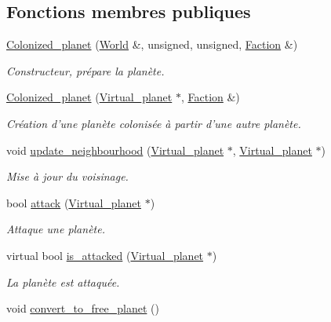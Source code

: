 \subsection*{Fonctions membres publiques}
\begin{DoxyCompactItemize}
\item 
\hyperlink{classColonized__planet_a06b9d86c2d48d101688ec202c8d37dd8}{Colonized\-\_\-planet} (\hyperlink{classWorld}{World} \&, unsigned, unsigned, \hyperlink{classFaction}{Faction} \&)
\begin{DoxyCompactList}\small\item\em Constructeur, prépare la planète. \end{DoxyCompactList}\item 
\hyperlink{classColonized__planet_a39273e5d94de78e93438e5007ddbecc1}{Colonized\-\_\-planet} (\hyperlink{classVirtual__planet}{Virtual\-\_\-planet} $\ast$, \hyperlink{classFaction}{Faction} \&)
\begin{DoxyCompactList}\small\item\em Création d'une planète colonisée à partir d'une autre planète. \end{DoxyCompactList}\item 
void \hyperlink{classColonized__planet_ac4f99490dc15c7715c1b476a490228a4}{update\-\_\-neighbourhood} (\hyperlink{classVirtual__planet}{Virtual\-\_\-planet} $\ast$, \hyperlink{classVirtual__planet}{Virtual\-\_\-planet} $\ast$)
\begin{DoxyCompactList}\small\item\em Mise à jour du voisinage. \end{DoxyCompactList}\item 
bool \hyperlink{classColonized__planet_a7a0ca9e84837a2f03900f01b1e1a3fa6}{attack} (\hyperlink{classVirtual__planet}{Virtual\-\_\-planet} $\ast$)
\begin{DoxyCompactList}\small\item\em Attaque une planète. \end{DoxyCompactList}\item 
virtual bool \hyperlink{classColonized__planet_af637772fb84e45bb47447c88aa8d3f4a}{is\-\_\-attacked} (\hyperlink{classVirtual__planet}{Virtual\-\_\-planet} $\ast$)
\begin{DoxyCompactList}\small\item\em La planète est attaquée. \end{DoxyCompactList}\item 
void \hyperlink{classColonized__planet_ae05d410995da1c4846bee779a3f6c831}{convert\-\_\-to\-\_\-free\-\_\-planet} ()

\end{DoxyCompactItemize}
